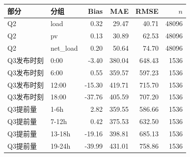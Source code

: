 \begin{tabular}{llrrrr}
\toprule
部分 & 分组 & Bias & MAE & RMSE & $n$ \\
\midrule
Q2 & load & 0.32 & 29.47 & 40.71 & 48096 \\
Q2 & pv & 0.13 & 30.89 & 62.53 & 48096 \\
Q2 & net_load & 0.20 & 50.64 & 74.70 & 48096 \\
Q3发布时刻 & 0:00 & -3.40 & 380.04 & 648.43 & 1536 \\
Q3发布时刻 & 6:00 & 0.55 & 359.57 & 597.23 & 1536 \\
Q3发布时刻 & 12:00 & -15.30 & 419.71 & 715.70 & 1536 \\
Q3发布时刻 & 18:00 & -37.76 & 405.59 & 707.20 & 1536 \\
Q3提前量 & 1-6h & 2.82 & 359.55 & 586.66 & 1536 \\
Q3提前量 & 7-12h & 0.42 & 375.53 & 632.50 & 1536 \\
Q3提前量 & 13-18h & -19.16 & 398.81 & 685.13 & 1536 \\
Q3提前量 & 19-24h & -39.99 & 431.01 & 758.86 & 1536 \\
\bottomrule
\end{tabular}
